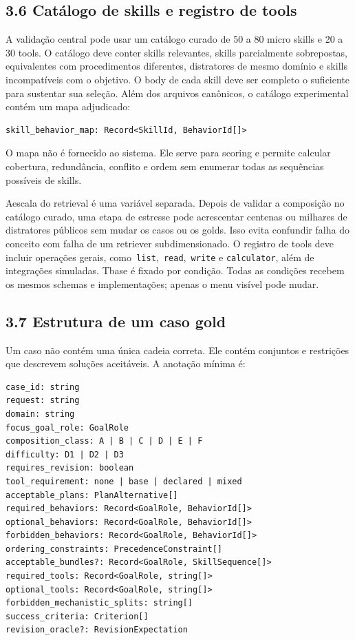 \documentclass[12pt,a4paper]{article}
\begin{document}
\subsection*{3.6 Catálogo de skills e registro de tools}

A validação central pode usar um catálogo curado de 50 a 80 micro skills e 20 a 30 tools. O catálogo deve conter skills relevantes, skills parcialmente sobrepostas, equivalentes com procedimentos diferentes, distratores de mesmo domínio e skills incompatíveis com o objetivo. O body de cada skill deve ser completo o suficiente para sustentar sua seleção. Além dos arquivos canônicos, o catálogo experimental contém um mapa adjudicado:


\begin{Verbatim}[breaklines=true,breakanywhere=true,fontsize=\small]
skill_behavior_map: Record<SkillId, BehaviorId[]>
\end{Verbatim}

O mapa não é fornecido ao sistema. Ele serve para scoring e permite calcular cobertura, redundância, conflito e ordem sem enumerar todas as sequências possíveis de skills.



Aescala do retrieval é uma variável separada. Depois de validar a composição no catálogo curado, uma etapa de estresse pode acrescentar centenas ou milhares de distratores públicos sem mudar os casos ou os golds. Isso evita confundir falha do conceito com falha de um retriever subdimensionado. O registro de tools deve incluir operações gerais, como\texttt{ list},\texttt{ read},\texttt{ write} e \texttt{calculator}, além de integrações simuladas. Tbase é fixado por condição. Todas as condições recebem os mesmos schemas e implementações; apenas o menu visível pode mudar.


\subsection*{3.7 Estrutura de um caso gold}

Um caso não contém uma única cadeia correta. Ele contém conjuntos e restrições que descrevem soluções aceitáveis. A anotação mínima é:


\begin{Verbatim}[breaklines=true,breakanywhere=true,fontsize=\small]
case_id: string
request: string
domain: string
focus_goal_role: GoalRole
composition_class: A | B | C | D | E | F
difficulty: D1 | D2 | D3
requires_revision: boolean
tool_requirement: none | base | declared | mixed
acceptable_plans: PlanAlternative[]
required_behaviors: Record<GoalRole, BehaviorId[]>
optional_behaviors: Record<GoalRole, BehaviorId[]>
forbidden_behaviors: Record<GoalRole, BehaviorId[]>
ordering_constraints: PrecedenceConstraint[]
acceptable_bundles?: Record<GoalRole, SkillSequence[]>
required_tools: Record<GoalRole, string[]>
optional_tools: Record<GoalRole, string[]>
forbidden_mechanistic_splits: string[]
success_criteria: Criterion[]
revision_oracle?: RevisionExpectation
\end{Verbatim}
\end{document}
